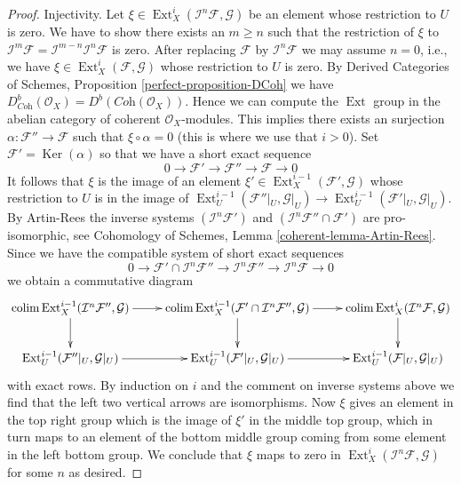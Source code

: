 \documentclass[10pt,a4paper]{amsart}
\theoremstyle{plain}
\theoremstyle{definition}
\theoremstyle{remark}
\numberwithin{equation}{subsection}
\def\colim{\mathop{\mathrm{colim}}\nolimits}
\def\Ext{\mathop{\mathrm{Ext}}\nolimits}
\def\Ker{\mathop{\mathrm{Ker}}}
\begin{document}
\begin{proof}
\medskip\noindent
Injectivity. Let $\xi \in \Ext^i_X(\mathcal{I}^n\mathcal{F}, \mathcal{G})$
be an element whose restriction to $U$ is zero. We have to show there exists
an $m \geq n$ such that the restriction of $\xi$ to
$\mathcal{I}^m\mathcal{F} = \mathcal{I}^{m - n}\mathcal{I}^n\mathcal{F}$
is zero. After replacing $\mathcal{F}$ by $\mathcal{I}^n\mathcal{F}$
we may assume $n = 0$, i.e., we have
$\xi \in \Ext^i_X(\mathcal{F}, \mathcal{G})$
whose restriction to $U$ is zero. By
Derived Categories of Schemes, Proposition \ref{perfect-proposition-DCoh}
we have
$D^b_{\textit{Coh}}(\mathcal{O}_X) = D^b(\textit{Coh}(\mathcal{O}_X))$.
Hence we can compute the $\Ext$ group in the abelian category of
coherent $\mathcal{O}_X$-modules. This implies there exists an
surjection $\alpha : \mathcal{F}'' \to \mathcal{F}$ such that
$\xi \circ \alpha = 0$ (this is where we use that $i > 0$).
Set $\mathcal{F}' = \Ker(\alpha)$ so that we have a short exact
sequence
$$
0 \to \mathcal{F}' \to \mathcal{F}'' \to \mathcal{F} \to 0
$$
It follows that $\xi$ is the image of an element
$\xi' \in \Ext^{i - 1}_X(\mathcal{F}', \mathcal{G})$
whose restriction to $U$ is in the image of
$\Ext^{i - 1}_U(\mathcal{F}''|_U, \mathcal{G}|_U) \to
\Ext^{i - 1}_U(\mathcal{F}'|_U, \mathcal{G}|_U)$.
By Artin-Rees the inverse systems $(\mathcal{I}^n\mathcal{F}')$ and
$(\mathcal{I}^n \mathcal{F}'' \cap \mathcal{F}')$ are pro-isomorphic, see
Cohomology of Schemes, Lemma \ref{coherent-lemma-Artin-Rees}.
Since we have the compatible system of short exact sequences
$$
0 \to
\mathcal{F}' \cap \mathcal{I}^n\mathcal{F}'' \to
\mathcal{I}^n\mathcal{F}'' \to
\mathcal{I}^n\mathcal{F} \to 0
$$
we obtain a commutative diagram
$$
\xymatrix{
\colim \Ext^{i - 1}_X(\mathcal{I}^n\mathcal{F}'', \mathcal{G})
\ar[r] \ar[d] &
\colim \Ext^{i - 1}_X(\mathcal{F}' \cap \mathcal{I}^n\mathcal{F}'', \mathcal{G})
\ar[r] \ar[d] &
\colim \Ext^i_X(\mathcal{I}^n\mathcal{F}, \mathcal{G})
\ar[d] \\
\Ext^{i - 1}_U(\mathcal{F}''|_U, \mathcal{G}|_U) \ar[r] &
\Ext^{i - 1}_U(\mathcal{F}'|_U, \mathcal{G}|_U) \ar[r] &
\Ext^{i - 1}_U(\mathcal{F}|_U, \mathcal{G}|_U)
}
$$
with exact rows. By induction on $i$ and the comment on inverse systems above
we find that the left two vertical arrows are isomorphisms.
Now $\xi$ gives an element in the top right group which is the image
of $\xi'$ in the middle top group, which in turn maps to an element of
the bottom middle group coming from some element in the left bottom group.
We conclude that $\xi$ maps to zero in
$\Ext^i_X(\mathcal{I}^n\mathcal{F}, \mathcal{G})$
for some $n$ as desired.


\end{proof}
\end{document}
